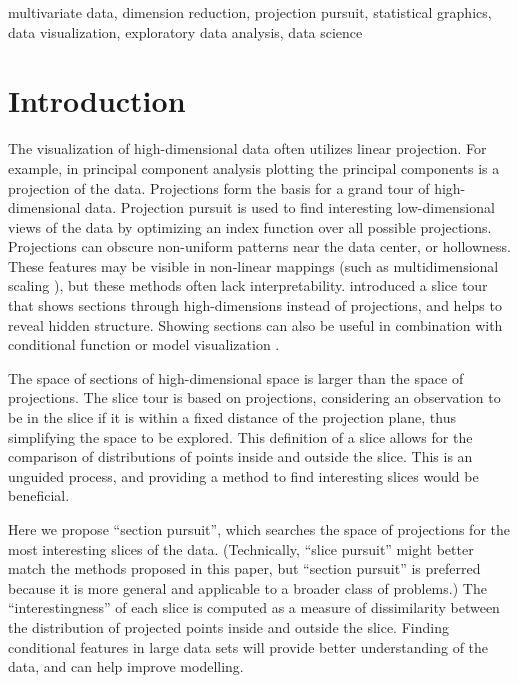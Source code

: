\documentclass[]{interact}
\theoremstyle{plain}%
\theoremstyle{definition}
\theoremstyle{remark}
\begin{document}
\begin{keywords}
multivariate data, dimension reduction, projection pursuit, statistical
graphics, data visualization, exploratory data analysis, data science
\end{keywords}

\hypersetup{linkcolor=black}

\hypertarget{introduction}{%
\section{Introduction}\label{introduction}}

The visualization of high-dimensional data often utilizes linear
projection. For example, in principal component analysis plotting the
principal components is a projection of the data. Projections form the
basis for a grand tour \citep{As85} of high-dimensional data. Projection
pursuit \citep[\citet{FT74}]{kr69} is used to find interesting
low-dimensional views of the data by optimizing an index function over
all possible projections. Projections can obscure non-uniform patterns
near the data center, or hollowness. These features may be visible in
non-linear mappings (such as multidimensional scaling \citep{mds}), but
these methods often lack interpretability. \citet{laa2019slice}
introduced a slice tour that shows sections through high-dimensions
instead of projections, and helps to reveal hidden structure. Showing
sections can also be useful in combination with conditional function or
model visualization \citep[\citet{sliceplorer}]{JSSv081i05}.

The space of sections of high-dimensional space is larger than the space
of projections. The slice tour is based on projections, considering an
observation to be in the slice if it is within a fixed distance of the
projection plane, thus simplifying the space to be explored. This
definition of a slice allows for the comparison of distributions of
points inside and outside the slice. This is an unguided process, and
providing a method to find interesting slices would be beneficial.

Here we propose ``section pursuit'', which searches the space of
projections for the most interesting slices of the data. (Technically,
``slice pursuit'' might better match the methods proposed in this paper,
but ``section pursuit'' is preferred because it is more general and
applicable to a broader class of problems.) The ``interestingness'' of
each slice is computed as a measure of dissimilarity between the
distribution of projected points inside and outside the slice. Finding
conditional features in large data sets will provide better
understanding of the data, and can help improve modelling.
\end{document}
